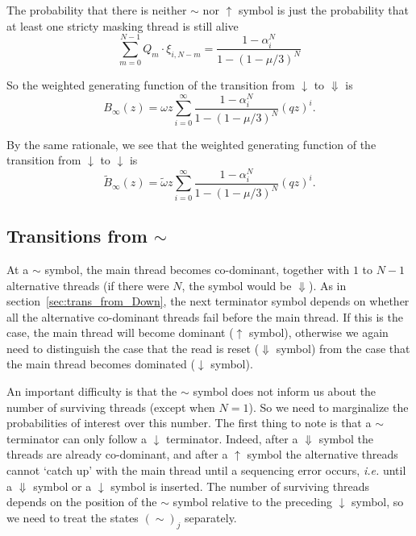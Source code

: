\documentclass{article}
\begin{document}
The probability that there is neither $\sim$ nor $\uparrow$ symbol is just
the probability that at least one stricty masking thread is still alive
\begin{equation}
\sum_{m=0}^{N-1}Q_m \cdot \xi_{i,N-m} = \frac{1-\alpha_i^N}{1-(1-\mu/3)^N}
\end{equation}

So the weighted generating function of the transition from $\downarrow$ to
$\Downarrow$ is
\begin{equation}
B_\infty(z) = \omega z\sum_{i=0}^\infty
\frac{1-\alpha_i^N}{1-(1-\mu/3)^N} (qz)^i.
\end{equation}

By the same rationale, we see that the weighted generating function of the
transition from $\downarrow$ to $\downarrow$ is
\begin{equation}
\tilde{B}_\infty(z) = \tilde{\omega} z\sum_{i=0}^\infty
\frac{1-\alpha_i^N}{1-(1-\mu/3)^N} (qz)^i.
\end{equation}

\subsection{Transitions from $\sim$}
\label{sec:trans_from_sim}

At a $\sim$ symbol, the main thread becomes co-dominant, together with $1$
to $N-1$ alternative threads (if there were $N$, the symbol would be
$\Downarrow$). As in section~\ref{sec:trans_from_Down}, the next
terminator symbol depends on whether all the alternative co-dominant
threads fail before the main thread. If this is the case, the main thread
will become dominant ($\uparrow$ symbol), otherwise we again need to
distinguish the case that the read is reset ($\Downarrow$ symbol) from the
case that the main thread becomes dominated ($\downarrow$ symbol).

An important difficulty is that the $\sim$ symbol does not inform us about
the number of surviving threads (except when $N = 1$). So we need to
marginalize the probabilities of interest over this number. The first
thing to note is that a $\sim$ terminator can only follow a $\downarrow$
terminator. Indeed, after a $\Downarrow$ symbol the threads are already
co-dominant, and after a $\uparrow$ symbol the alternative threads cannot
`catch up' with the main thread until a sequencing error occurs,
\textit{i.e.} until a $\Downarrow$ symbol or a $\downarrow$ symbol is
inserted. The number of surviving threads depends on the position of the
$\sim$ symbol relative to the preceding $\downarrow$ symbol, so we need
to treat the states $(\sim)_j$ separately.
\end{document}
